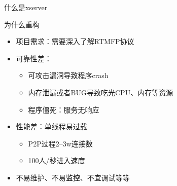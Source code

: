 \documentclass{beamer}
\begin{document}
\begin{frame}[t]{什么是xserver}
\begin{itemize}
{\begin{small}
\begin{figure}[h]
{
                }
                \end{figure}
                \end{small}
        }
    \end{itemize}
\end{frame}

\begin{frame}[t]{为什么重构}
    \begin{itemize}
        \item 项目需求：需要深入了解RTMFP协议
        \item 可靠性差：
            \begin{itemize}
                \item 可攻击漏洞导致程序crash
                \item 内存泄漏或者BUG导致吃光CPU、内存等资源
                \item 程序僵死：服务无响应
            \end{itemize}
        \item 性能差：单线程易过载
            \begin{itemize}
                \item P2P过程2--3w连接数
                \item 100人/秒进入速度
            \end{itemize}
        \item 不易维护、不易监控、不宜调试等等
    \end{itemize}
\end{frame}
\end{document}

